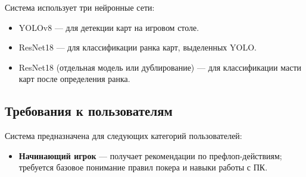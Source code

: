 Система использует три нейронные сети:  
\begin{itemize}
    \item YOLOv8 --- для детекции карт на игровом столе.  
    \item ResNet18 --- для классификации ранка карт, выделенных YOLO.  
    \item ResNet18 (отдельная модель или дублирование) --- для классификации масти карт после определения ранка.  
\end{itemize}

\subsection{Требования к пользователям}

Система предназначена для следующих категорий пользователей:

\begin{itemize}
    \item \textbf{Начинающий игрок} --- получает рекомендации по префлоп-действиям; требуется базовое понимание правил покера и навыки работы с ПК.
\end{itemize}
